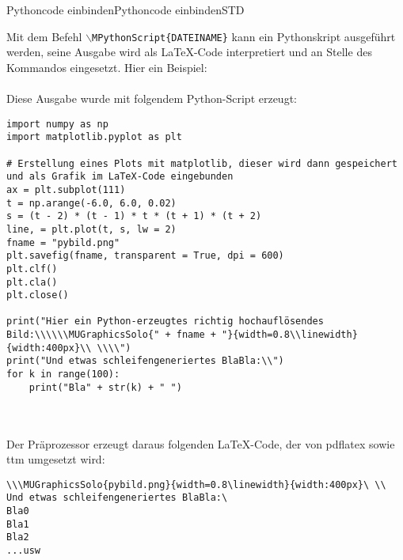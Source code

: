 \begin{MXContent}{Pythoncode einbinden}{Pythoncode einbinden}{STD}

\begin{MExample}
Mit dem Befehl \texttt{$\backslash$MPythonScript\{DATEINAME\}} kann ein Pythonskript ausgeführt werden, seine Ausgabe wird als LaTeX-Code interpretiert
und an Stelle des Kommandos eingesetzt. Hier ein Beispiel: 
\ \\ \ \\
Diese Ausgabe wurde mit folgendem Python-Script erzeugt:
\begin{verbatim}
import numpy as np
import matplotlib.pyplot as plt

# Erstellung eines Plots mit matplotlib, dieser wird dann gespeichert und als Grafik im LaTeX-Code eingebunden
ax = plt.subplot(111)
t = np.arange(-6.0, 6.0, 0.02)
s = (t - 2) * (t - 1) * t * (t + 1) * (t + 2)
line, = plt.plot(t, s, lw = 2)
fname = "pybild.png"
plt.savefig(fname, transparent = True, dpi = 600)
plt.clf()
plt.cla()
plt.close()

print("Hier ein Python-erzeugtes richtig hochauflösendes Bild:\\\\\\MUGraphicsSolo{" + fname + "}{width=0.8\\linewidth}{width:400px}\\ \\\\")
print("Und etwas schleifengeneriertes BlaBla:\\")
for k in range(100):
    print("Bla" + str(k) + " ")
\end{verbatim}
\ \\ \ \\
Der Präprozessor erzeugt daraus folgenden LaTeX-Code, der von pdflatex sowie ttm umgesetzt wird:
\ \\
\begin{verbatim}
\\\MUGraphicsSolo{pybild.png}{width=0.8\linewidth}{width:400px}\ \\
Und etwas schleifengeneriertes BlaBla:\
Bla0
Bla1
Bla2
...usw
\end{verbatim}
\end{MExample}


\end{MXContent}


